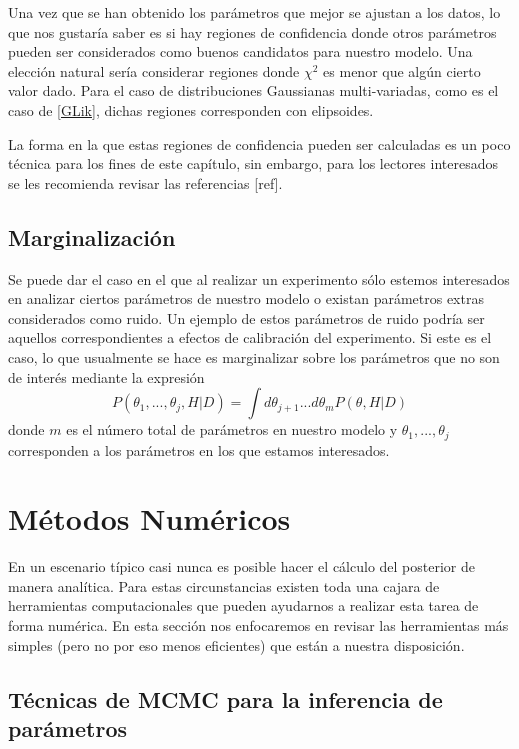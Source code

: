 \documentclass[onecolumn,           %
               showpacs,            %
               preprintnumbers,     %
               aps,                 %
               prl,          	    %
               letterpaper,             %
               superscriptaddress,      %
               nofootinbib,         %
               tightenlines,        %
               floats,floatfix      %
               ,usenatbib,
               ]{revtex4-1}
\begin{document}
Una vez que se han obtenido los par\'ametros que mejor se ajustan a los datos, lo que nos gustar\'ia saber es si hay regiones de confidencia donde otros par\'ametros pueden ser considerados como buenos candidatos para nuestro modelo. Una elecci\'on natural ser\'ia considerar regiones donde $\chi^2$ es menor que alg\'un cierto valor dado. Para el caso de distribuciones Gaussianas multi-variadas, como es el caso de \eqref{GLik}, dichas regiones corresponden con elipsoides.

La forma en la que estas regiones de confidencia pueden ser calculadas es un poco t\'ecnica para los fines de este cap\'itulo, sin embargo, para los lectores interesados se les recomienda revisar las referencias [ref].
\subsection{Marginalizaci\'on}

Se puede dar el caso en el que al realizar un experimento s\'olo estemos interesados en analizar ciertos par\'ametros de nuestro modelo o existan par\'ametros extras considerados como ruido. Un ejemplo de estos par\'ametros de ruido podr\'ia ser aquellos correspondientes a efectos de calibraci\'on del experimento. Si este es el caso, lo que usualmente se hace es marginalizar sobre los par\'ametros que no son de inter\'es mediante la expresi\'on
\begin{equation}
P(\theta_1,...,\theta_j,H|D)=\int d\theta_{j+1}...d\theta_{m}P(\theta,H|D)
\end{equation}
donde $m$ es el n\'umero total de par\'ametros en nuestro modelo y $\theta_1,...,\theta_j$ corresponden a los par\'ametros en los que estamos interesados.

\section{M\'etodos Num\'ericos}

En un escenario t\'ipico casi nunca es posible hacer el c\'alculo del posterior de manera anal\'itica. Para estas circunstancias existen toda una cajara de herramientas computacionales que pueden ayudarnos a realizar esta tarea de forma num\'erica. En esta secci\'on nos enfocaremos en revisar las herramientas m\'as simples (pero no por eso menos eficientes) que est\'an a nuestra disposici\'on.

\subsection{T\'ecnicas de MCMC para la inferencia de par\'ametros}
\end{document}
